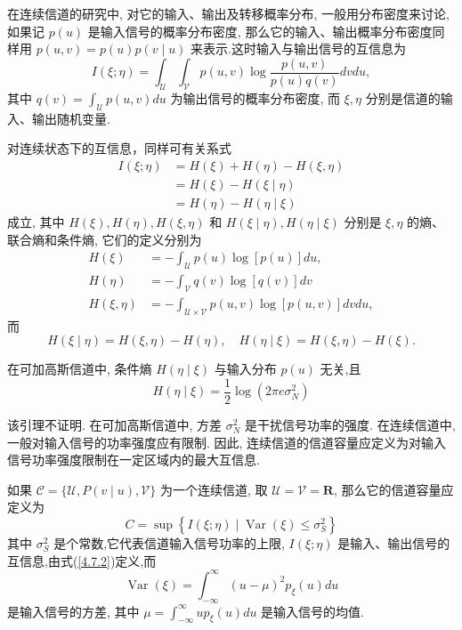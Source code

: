 在连续信道的研究中, 对它的输入、输出及转移概率分布, 一般用分布密度来讨论, 如果记 $ p(u) $ 是输入信号的概率分布密度, 那么它的输入、输出概率分布密度同样用 $ p(u, v)=p(u) p(v \mid u) $ 来表示.这时输入与输出信号的互信息为
\begin{equation}\label{4.7.2}
    I(\xi ; \eta)=\int_{\mathscr{U}} \int_{\mathscr{V}} p(u, v) \log \frac{p(u, v)}{p(u) q(v)} d v d u,
\end{equation}
其中 $ q(v)=\displaystyle\int_{\mathscr{U}} p(u, v) d u $ 为输出信号的概率分布密度, 而 $ \xi, \eta $ 分别是信道的输入、输出随机变量.

对连续状态下的互信息，同样可有关系式
$$
\begin{aligned}
I(\xi ; \eta) & =H(\xi)+H(\eta)-H(\xi, \eta) \\
& =H(\xi)-H(\xi \mid \eta) \\
& =H(\eta)-H(\eta \mid \xi)
\end{aligned}
$$
成立, 其中 $ H(\xi), H(\eta), H(\xi, \eta) $ 和 $ H(\xi \mid \eta), H(\eta \mid \xi) $ 分别是 $ \xi, \eta $ 的熵、联合熵和条件熵, 它们的定义分别为
$$
\begin{aligned}
H(\xi)&=-\int_{\mathscr{U}} p(u) \log [p(u)] d u, \\
H(\eta)&=-\int_{\mathscr{V}} q(v) \log [q(v)] d v \\
H(\xi, \eta)&=-\int_{\mathscr{U} \times \mathscr{V}} p(u, v) \log [p(u, v)] d v d u,
\end{aligned}
$$
而
$$
H(\xi \mid \eta)=H(\xi, \eta)-H(\eta), \quad H(\eta \mid \xi)=H(\xi, \eta)-H(\xi) .
$$
\begin{lemma}\label{lemma4.7.1}
    在可加高斯信道中, 条件熵 $ H(\eta \mid \xi) $ 与输入分布 $ p(u) $ 无关,且
$$
H(\eta \mid \xi)=\frac{1}{2} \log \left(2 \pi e \sigma_{N}^{2}\right)
$$
\end{lemma}

该引理不证明.
在可加高斯信道中, 方差 $ \sigma_{N}^{2} $ 是干扰信号功率的强度. 在连续信道中,一般对输入信号的功率强度应有限制. 因此, 连续信道的信道容量应定义为对输入信号功率强度限制在一定区域内的最大互信息.

\begin{definition}
    如果 $ \mathscr{C}=\{\mathscr{U}, P(v \mid u), \mathscr{V}\} $ 为一个连续信道, 取 $ \mathscr{U}=\mathscr{V}=\mathbf{R} $, 那么它的信道容量应定义为
\begin{equation}\label{4.7.3}
    C=\sup \left\{I(\xi ; \eta) \mid \operatorname{Var}(\xi) \leq \sigma_{S}^{2}\right\}
\end{equation}
其中 $ \sigma_{S}^{2} $ 是个常数,它代表信道输入信号功率的上限, $ I(\xi ; \eta) $ 是输入、输出信号的互信息,由式(\ref{4.7.2})定义,而
$$
\operatorname{Var}(\xi)=\int_{-\infty}^{\infty}(u-\mu)^{2} p_{\xi}(u) d u
$$
是输入信号的方差, 其中 $ \mu=\displaystyle\int_{-\infty}^{\infty} u p_{\xi}(u) d u $ 是输入信号的均值.
\end{definition}

